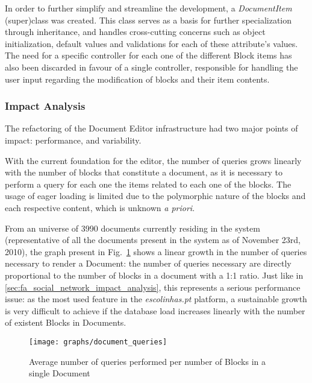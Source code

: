 In order to further simplify and streamline the development, a \emph{DocumentItem} (super)class was created. This class serves as a basis for further specialization through inheritance, and handles cross-cutting concerns such as object initialization, default values and validations for each of these attribute's values. The need for a specific controller for each one of the different Block items has also been discarded in favour of a single controller, responsible for handling the user input regarding the modification of blocks and their item contents.

\subsubsection{Impact Analysis}\label{sec:fa_documents_impact_analysis}

The refactoring of the Document Editor infrastructure had two major points of impact: performance, and variability.


With the current foundation for the editor, the number of queries grows linearly with the number of blocks that constitute a document, as it is necessary to perform a query for each one the items related to each one of the blocks. The usage of eager loading is limited due to the polymorphic nature of the blocks and each respective content, which is unknown \emph{a priori}.

From an universe of 3990 documents currently residing in the system (representative of all the documents present in the system as of November 23rd, 2010), the graph present in Fig.~\ref{fig:queries_per_blocks_in_document} shows a linear growth in the number of queries necessary to render a Document: the number of queries necessary are directly proportional to the number of blocks in a document with a 1:1 ratio. Just like in \ref{sec:fa_social_network_impact_analysis}, this represents a serious performance issue: as the most used feature in the \emph{escolinhas.pt} platform, a sustainable growth is very difficult to achieve if the database load increases linearly with the number of existent Blocks in Documents.

\begin{figure}[h]
  \centering
  \texttt{[image: graphs/document\_queries]}
  \caption{Average number of queries performed per number of Blocks in a single Document}
  \label{fig:queries_per_blocks_in_document}
\end{figure}

